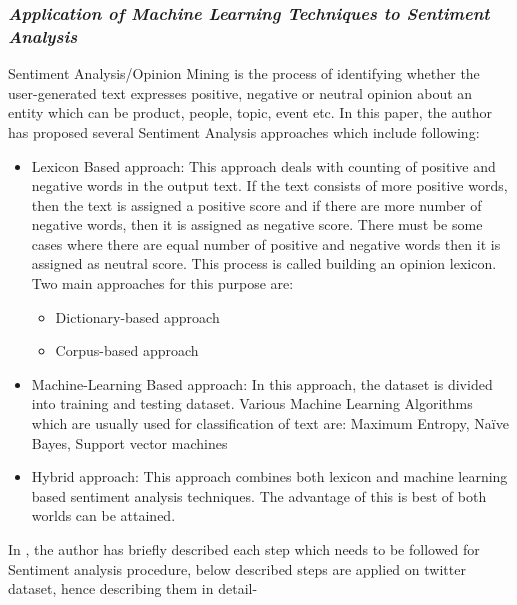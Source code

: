\documentclass[conference]{IEEEtran}
\begin{document}
\subsubsection{\textit{Application of Machine Learning Techniques to Sentiment Analysis\cite{b9}}}
Sentiment Analysis/Opinion Mining is the process of identifying whether the user-generated text expresses positive, negative or neutral opinion about an entity which can be product, people, topic, event etc.
In this paper, the author has proposed several Sentiment Analysis approaches which include following:
\begin{itemize}
	\item Lexicon Based approach: This approach deals with counting of positive and negative words in the output text. If the text consists of more positive words, then the text is assigned a positive score and if there are more number of negative words, then it is assigned as negative score. There must be some cases where there are equal number of positive and negative words then it is assigned as neutral score. This process is called building an opinion lexicon. Two main approaches for this purpose are:
	\begin{itemize}
		\item Dictionary-based approach
		\item Corpus-based approach
		
	\end{itemize}
	\item Machine-Learning Based approach: In this approach, the dataset is divided into training and testing dataset. Various Machine Learning Algorithms which are usually used for classification of text are: Maximum Entropy, Naïve Bayes, Support vector machines
	\item Hybrid approach: This approach combines both lexicon and machine learning based sentiment analysis techniques. The advantage of this is best of both worlds can be attained.
\end{itemize}
In \cite{b9}, the author has briefly described each step which needs to be followed for Sentiment analysis procedure, below described steps are applied on twitter dataset, hence describing them in detail- 
\end{document}
